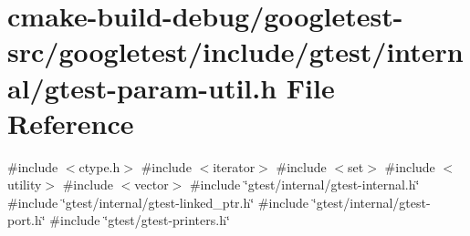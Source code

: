 \hypertarget{gtest-param-util_8h}{}\section{cmake-\/build-\/debug/googletest-\/src/googletest/include/gtest/internal/gtest-\/param-\/util.h File Reference}
\label{gtest-param-util_8h}
{\ttfamily \#include $<$ctype.\+h$>$}\newline
{\ttfamily \#include $<$iterator$>$}\newline
{\ttfamily \#include $<$set$>$}\newline
{\ttfamily \#include $<$utility$>$}\newline
{\ttfamily \#include $<$vector$>$}\newline
{\ttfamily \#include \char`\"{}gtest/internal/gtest-\/internal.\+h\char`\"{}}\newline
{\ttfamily \#include \char`\"{}gtest/internal/gtest-\/linked\+\_\+ptr.\+h\char`\"{}}\newline
{\ttfamily \#include \char`\"{}gtest/internal/gtest-\/port.\+h\char`\"{}}\newline
{\ttfamily \#include \char`\"{}gtest/gtest-\/printers.\+h\char`\"{}}\newline
